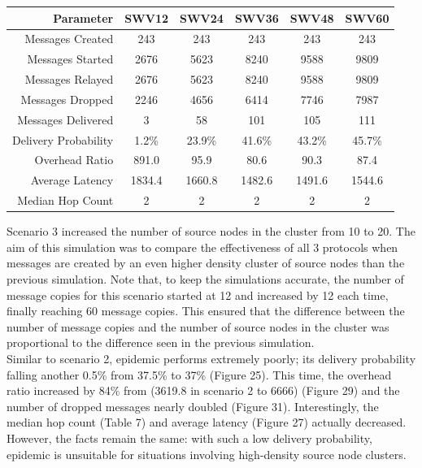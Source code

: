 \documentclass{article}
\begin{document}
\begin{center}
\vspace{6px}
\begin{tabular}{|r|c|c|c|c|c|}
\hline
\textbf{Parameter} & \textbf{SWV12} & \textbf{SWV24} & \textbf{SWV36} & \textbf{SWV48} & \textbf{SWV60} \\ \hline
Messages Created & 243 & 243 & 243 & 243 & 243 \\ \hline
Messages Started & 2676 & 5623 & 8240 & 9588 & 9809 \\ \hline
Messages Relayed & 2676 & 5623 & 8240 & 9588 & 9809 \\ \hline
Messages Dropped & 2246 & 4656 & 6414 & 7746 & 7987 \\ \hline
Messages Delivered & 3 & 58 & 101 & 105 & 111 \\ \hline
Delivery Probability & 1.2\% & 23.9\% & 41.6\% & 43.2\% & 45.7\% \\ \hline
Overhead Ratio & 891.0 & 95.9 & 80.6 & 90.3 & 87.4 \\ \hline
Average Latency & 1834.4 & 1660.8 & 1482.6 & 1491.6 & 1544.6 \\ \hline
Median Hop Count & 2 & 2 & 2 & 2 & 2 \\ \hline
\end{tabular}
\end{center}

\newpage

\noindent Scenario 3 increased the number of source nodes in the cluster from 10 to 20. The aim of this simulation was to compare the effectiveness of all 3 protocols when messages are created by an even higher density cluster of source nodes than the previous simulation. Note that, to keep the simulations accurate, the number of message copies for this scenario started at 12 and increased by 12 each time, finally reaching 60 message copies. This ensured that the difference between the number of message copies and the number of source nodes in the cluster was proportional to the difference seen in the previous simulation.\\
\newline Similar to scenario 2, epidemic performs extremely poorly; its delivery probability falling another 0.5\% from 37.5\% to 37\% (Figure 25). This time, the overhead ratio increased by 84\% from (3619.8 in scenario 2 to 6666) (Figure 29) and the number of dropped messages nearly doubled (Figure 31). Interestingly, the median hop count (Table 7) and average latency (Figure 27) actually decreased. However, the facts remain the same: with such a low delivery probability, epidemic is unsuitable for situations involving high-density source node clusters.\\
\newline 
\end{document}
